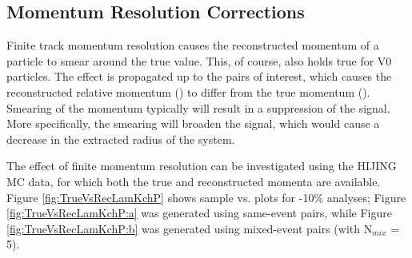 \documentclass[../AnalysisNoteJBuxton.tex]{subfiles}
\begin{document}
\subsection{Momentum Resolution Corrections}
\label{MomentumResolutionCorrections}

Finite track momentum resolution causes the reconstructed momentum of a particle to smear around the true value.
This, of course, also holds true for V0 particles.
The effect is propagated up to the pairs of interest, which causes the reconstructed relative momentum (\krec) to differ from the true momentum (\ktrue).
Smearing of the momentum typically will result in a suppression of the signal.  More specifically, the smearing will broaden the signal, which would cause a decrease in the extracted radius of the system.

The effect of finite momentum resolution can be investigated using the HIJING MC data, for which both the true and reconstructed momenta are available.
Figure \ref{fig:TrueVsRecLamKchP} shows sample \ktrue vs. \krec plots for -10\% analyses; Figure \ref{fig:TrueVsRecLamKchP:a} was generated using same-event pairs, while Figure \ref{fig:TrueVsRecLamKchP:b} was generated using mixed-event pairs (with N$_{mix}$ = 5).  
\end{document}
